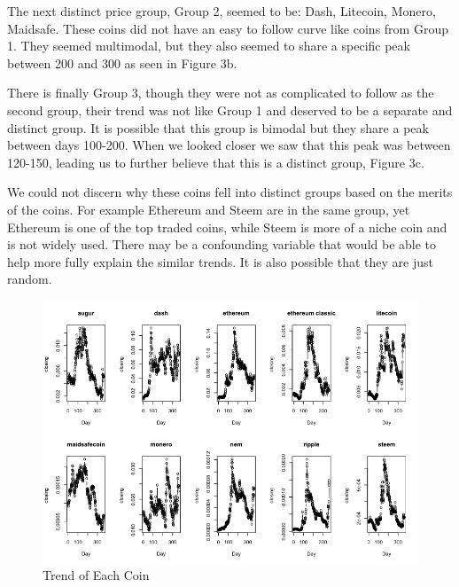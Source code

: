 \documentclass[12pt]{article}
\begin{document}
\indent The next distinct price group, Group 2, seemed to be: Dash, Litecoin, Monero, Maidsafe. These coins did not have an easy to follow curve like coins from Group 1. They seemed multimodal, but they also seemed to share a specific peak between 200 and 300 as seen in Figure 3b.

\indent There is finally Group 3, though they were not as complicated to follow as the second group, their trend was not like Group 1 and deserved to be a separate and distinct group. It is possible that this group is bimodal but they share a peak between days 100-200. When we looked closer we saw that this peak was between 120-150, leading us to further believe that this is a distinct group, Figure 3c.

\indent We could not discern why these coins fell into distinct groups based on the merits of the coins. For example Ethereum and Steem are in the same group, yet Ethereum is one of the top traded coins, while Steem is more of a niche coin and is not widely used. There may be a confounding variable that would be able to help more fully explain the similar trends. It is also possible that they are just random.

\begin{figure}

\centering
  \includegraphics[width=\linewidth]{images/AllCoinTrends1.png}
 \caption{Trend of Each Coin}
\label{label}

\end{figure}
\end{document}
